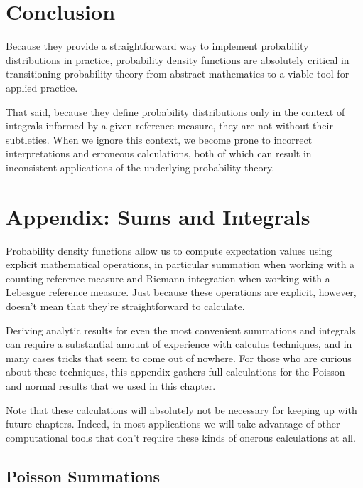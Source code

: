 \documentclass[
  letterpaper,
  DIV=11,
  numbers=noendperiod]{scrartcl}
\begin{document}
\section{Conclusion}\label{conclusion}

Because they provide a straightforward way to implement probability
distributions in practice, probability density functions are absolutely
critical in transitioning probability theory from abstract mathematics
to a viable tool for applied practice.

That said, because they define probability distributions only in the
context of integrals informed by a given reference measure, they are not
without their subtleties. When we ignore this context, we become prone
to incorrect interpretations and erroneous calculations, both of which
can result in inconsistent applications of the underlying probability
theory.

\section*{Appendix: Sums and Integrals}\label{sec:appendix}

Probability density functions allow us to compute expectation values
using explicit mathematical operations, in particular summation when
working with a counting reference measure and Riemann integration when
working with a Lebesgue reference measure. Just because these operations
are explicit, however, doesn't mean that they're straightforward to
calculate.

Deriving analytic results for even the most convenient summations and
integrals can require a substantial amount of experience with calculus
techniques, and in many cases tricks that seem to come out of nowhere.
For those who are curious about these techniques, this appendix gathers
full calculations for the Poisson and normal results that we used in
this chapter.

Note that these calculations will absolutely not be necessary for
keeping up with future chapters. Indeed, in most applications we will
take advantage of other computational tools that don't require these
kinds of onerous calculations at all.

\subsection{Poisson Summations}\label{poisson-summations}
\end{document}
